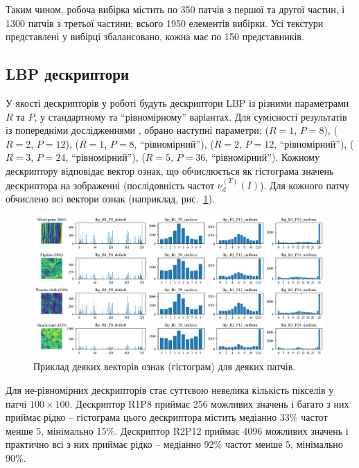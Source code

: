 Таким чином, робоча вибірка містить по 350 патчів з першої та другої частин, і 1300 патчів з третьої частини; всього 1950 елементів вибірки.
Усі текстури представлені у вибірці збалансовано, кожна має по 150 представників.

\subsection{LBP дескриптори}\label{section2.1b}\hfill

У якості дескрипторів у роботі будуть дескриптори LBP із різними параметрами $R$ та $P$, у стандартному та ``рівномірному'' варіантах.
Для сумісності результатів із попередніми дослідженнями \cite{ojala2002,fastlbp2024}, обрано наступні параметри:
($R=1$, $P=8$), ($R=2$, $P=12$), ($R=1$, $P=8$, ``рівномірний''), ($R=2$, $P=12$, ``рівномірний''), ($R=3$, $P=24$, ``рівномірний''), ($R=5$, $P=36$, ``рівномірний'').
Кожному дескриптору відповідає вектор ознак, що обчислюється як гістограма значень дескриптора на зображенні (послідовність частот $\nu^{(T)}_d(I)$).
Для кожного патчу обчислено всі вектори ознак (наприклад, рис.~\ref{fig:example-features}).

\begin{figure}[h]
    \centering
    \includegraphics[width=0.99\textwidth]{img/example_features.png}
    \caption{
        Приклад деяких векторів ознак (гістограм) для деяких патчів.
    }
    \label{fig:example-features}
\end{figure}

Для не-рівномірних дескрипторів стає суттєвою невелика кількість пікселів у патчі $100\times 100$.
Дескриптор R1P8 приймає 256 можливих значень і багато з них приймає рідко -- гістограма цього дескриптора містить медіанно 33\% частот менше 5, мінімально 15\%.
Дескриптор R2P12 приймає 4096 можливих значень і практично всі з них приймає рідко -- медіанно 92\% частот менше 5, мінімально 90\%.

